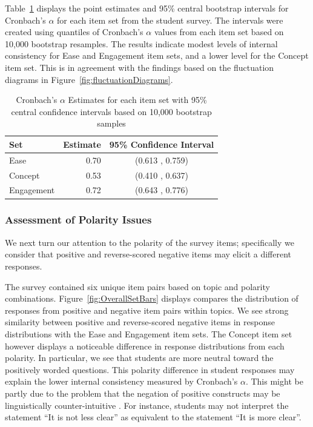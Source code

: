 \documentclass{article}\usepackage[]{graphicx}\usepackage[]{color}
\begin{document}
Table~\ref{cronbachstuff} displays the point estimates and 95\% central bootstrap intervals for Cronbach's $\alpha$ for each item set from the student survey.  The intervals were created using quantiles of Cronbach's $\alpha$ values from each item set based on 10,000 bootstrap resamples. 
 The results indicate modest levels of internal consistency for Ease and Engagement item sets, and a lower level for the Concept item set. This is in agreement with the findings based on the fluctuation diagrams in Figure~\ref{fig:fluctuationDiagrams}. 



\begin{table}[hbtp]
\centering
\begin{tabular}{lrc}
  \hline
Set & Estimate & 95\% Confidence Interval \\ 
  \hline
Ease & 0.70 & (0.613 , 0.759)\\ 
  Concept & 0.53 & (0.410 , 0.637) \\ 
  Engagement & 0.72 & (0.643 , 0.776) \\ 
   \hline
\end{tabular}
\caption{Cronbach's $\alpha$ Estimates for each item set with 95\% central confidence intervals based on 10,000 bootstrap samples} 
\label{cronbachstuff}
\end{table}

\subsubsection{Assessment of Polarity Issues}  

We next turn our attention to the polarity of the survey items; specifically we consider that positive and reverse-scored negative items may elicit a different responses.  

The survey contained six unique item pairs based on topic and polarity combinations. Figure~\ref{fig:OverallSetBars} displays compares the distribution of responses from positive and negative item pairs within topics.  We see strong similarity between positive and reverse-scored negative items in response distributions with the Ease and Engagement item sets. The Concept item set however displays a noticeable difference in response distributions from each polarity.  In particular, we see that students are more neutral toward the positively worded questions. This polarity difference in student responses may explain the lower internal consistency measured by Cronbach's $\alpha$. This might be partly due to the problem that the negation of positive constructs may be linguistically counter-intuitive \citep{Friborg2006}. For instance, students may not interpret the statement ``It is not less clear'' as equivalent to the statement ``It is more clear''.  
\end{document}
